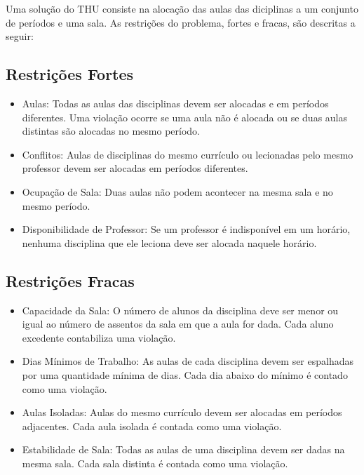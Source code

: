 \documentclass[11pt]{article}
\begin{document}
Uma solução do THU consiste na alocação das aulas das diciplinas a um conjunto de períodos e uma sala. As restrições do problema, fortes e fracas, são descritas a seguir:

\subsection{Restrições Fortes}

\begin{itemize}

\item Aulas: Todas as aulas das disciplinas devem ser alocadas e em períodos diferentes. Uma violação ocorre se uma aula não é alocada ou se duas aulas distintas são alocadas no mesmo período.

\item Conflitos: Aulas de disciplinas do mesmo currículo ou lecionadas pelo mesmo professor devem ser alocadas em períodos diferentes. 

\item Ocupação de Sala: Duas aulas não podem acontecer na mesma sala e no mesmo período.

\item Disponibilidade de Professor: Se um professor é indisponível em um horário, nenhuma disciplina que ele leciona deve ser alocada naquele horário.

\end{itemize}

\subsection{Restrições Fracas}

\begin{itemize}

\item Capacidade da Sala: O número de alunos da disciplina deve ser menor ou igual ao número de assentos da sala em que a aula for dada. Cada aluno excedente contabiliza uma violação.

\item Dias Mínimos de Trabalho: As aulas de cada disciplina devem ser espalhadas por uma quantidade mínima de dias. Cada dia abaixo do mínimo é contado como uma violação.

\item Aulas Isoladas: Aulas do mesmo currículo devem ser alocadas em períodos adjacentes. Cada aula isolada é contada como uma violação.

\item Estabilidade de Sala: Todas as aulas de uma disciplina devem ser dadas na mesma sala. Cada sala distinta é contada como uma violação.

\end{itemize}
\end{document}
